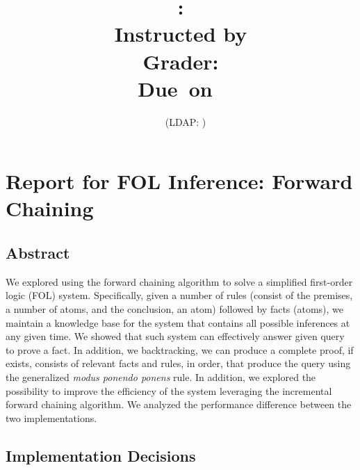 \documentclass[letterpaper]{article}
\title{\textmd{\bf \Class: \Title}\\{\large Instructed by \textit{\ClassInstructor}}\\{\vspace{-0.1in}\small Grader: \textit{\ClassGrader}}\\\normalsize\vspace{0.1in}\small{Due\ on\ \DueDate}}
\author{\textbf{\StudentName}\ \ (LDAP: \StudentLDAP)}
\begin{document}
\maketitle \thispagestyle{fpfancy}


\section{Report for FOL Inference: Forward Chaining}
\subsection{Abstract}
We explored using the forward chaining algorithm to solve a simplified first-order logic (FOL) system. Specifically, given a number of rules (consist of the premises, a number of atoms, and the conclusion, an atom) followed by facts (atoms), we maintain a knowledge base for the system that contains all possible inferences at any given time. We showed that such system can effectively answer given query to prove a fact. In addition, we backtracking, we can produce a complete proof, if exists, consists of relevant facts and rules, in order, that produce the query using the generalized \textit{modus ponendo ponens} rule. In addition, we explored the possibility to improve the efficiency of the system leveraging the incremental forward chaining algorithm. We analyzed the performance difference between the two implementations.
\subsection{Implementation Decisions}
\end{document}
